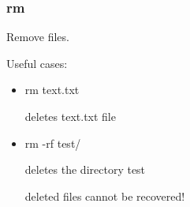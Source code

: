 \begin{frame}
	\frametitle{ rm}
        Remove files.

Useful cases:
	\begin{itemize}
        \item rm text.txt

        deletes text.txt file  
        \item rm -rf test/  
 
        deletes the directory test 

        deleted files cannot be recovered!

	\end{itemize}
        

\end{frame}

